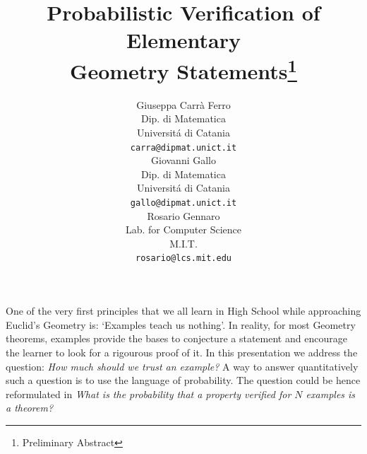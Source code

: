 
\setlength{\textheight}{8.5in}
\setlength{\textwidth}{6in}
\setlength{\headheight}{0in}
\addtolength{\topmargin}{-.5in}
\addtolength{\oddsidemargin}{-.5in}



\title{Probabilistic Verification of Elementary\\
       Geometry Statements\thanks{Preliminary Abstract}}

\author{\parbox[b]{1.9in}{\begin{center} \normalsize
                        {Giuseppa Carr\`a Ferro}\\%
			Dip. di Matematica\\ 
                        Universit\'{a} di Catania\\
                        {\tt carra@dipmat.unict.it}
                        \end{center}}
        \parbox[b]{1.9in}{\begin{center} \normalsize
                        {Giovanni Gallo}\\%
			Dip. di Matematica\\ 
                        Universit\'{a} di Catania\\
                        {\tt gallo@dipmat.unict.it}
                        \end{center}}
        \parbox[b]{1.9in}{\begin{center} \normalsize
                        {Rosario Gennaro}\\%
			Lab. for Computer Science\\
                        M.I.T.\\
                        {\tt rosario@lcs.mit.edu} 
                        \end{center}}
	}
\date{}



\maketitle

\noindent
One of the very first principles that we all learn in High School while 
approaching Euclid's Geometry is: `Examples teach us nothing'. In reality, 
for most Geometry theorems, examples provide the bases to conjecture a 
statement and encourage the learner to look for a rigourous proof of it.
In this presentation we address the question: {\em How much should we trust an 
example?} A way to answer quantitatively such a question 
is to use the language of probability. The question could be hence 
reformulated in {\em What is the probability that a property verified for 
$N$ examples is a theorem?}

